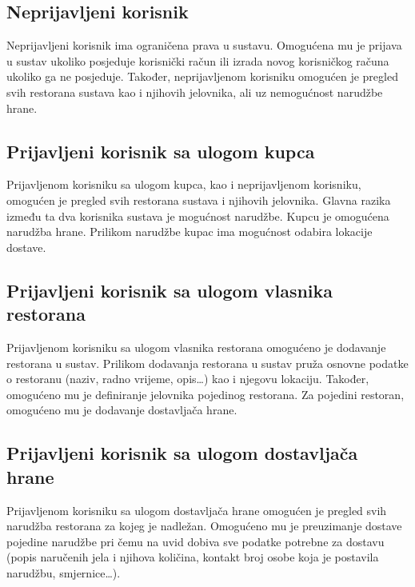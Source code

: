 \documentclass[times, utf8, zavrsni, numeric]{fer}
\begin{document}
\subsection{Neprijavljeni korisnik}
Neprijavljeni korisnik ima ograničena prava u sustavu. Omogućena mu je prijava u sustav ukoliko posjeduje korisnički račun ili izrada novog korisničkog računa ukoliko ga ne posjeduje. Također, neprijavljenom korisniku omogućen je pregled svih restorana sustava kao i njihovih jelovnika, ali uz nemogućnost narudžbe hrane.
\subsection{Prijavljeni korisnik sa ulogom kupca}
Prijavljenom korisniku sa ulogom kupca, kao i neprijavljenom korisniku, omogućen je pregled svih restorana sustava i njihovih jelovnika. Glavna razika između ta dva korisnika sustava je mogućnost narudžbe. Kupcu je omogućena narudžba hrane. Prilikom narudžbe kupac ima mogućnost odabira lokacije dostave.
\subsection{Prijavljeni korisnik sa ulogom vlasnika restorana}
Prijavljenom korisniku sa ulogom vlasnika restorana omogućeno je dodavanje restorana u sustav. Prilikom dodavanja restorana u sustav pruža osnovne podatke o restoranu (naziv, radno vrijeme, opis\ldots) kao i njegovu lokaciju. Također, omogućeno mu je definiranje jelovnika pojedinog restorana. Za pojedini restoran, omogućeno mu je dodavanje dostavljača hrane.
\subsection{Prijavljeni korisnik sa ulogom dostavljača hrane}
Prijavljenom korisniku sa ulogom dostavljača hrane omogućen je pregled svih narudžba restorana za kojeg je nadležan. Omogućeno mu je preuzimanje dostave pojedine narudžbe pri čemu na uvid dobiva sve podatke potrebne za dostavu (popis naručenih jela i njihova količina, kontakt broj osobe koja je postavila narudžbu, smjernice\ldots).  
\end{document}
